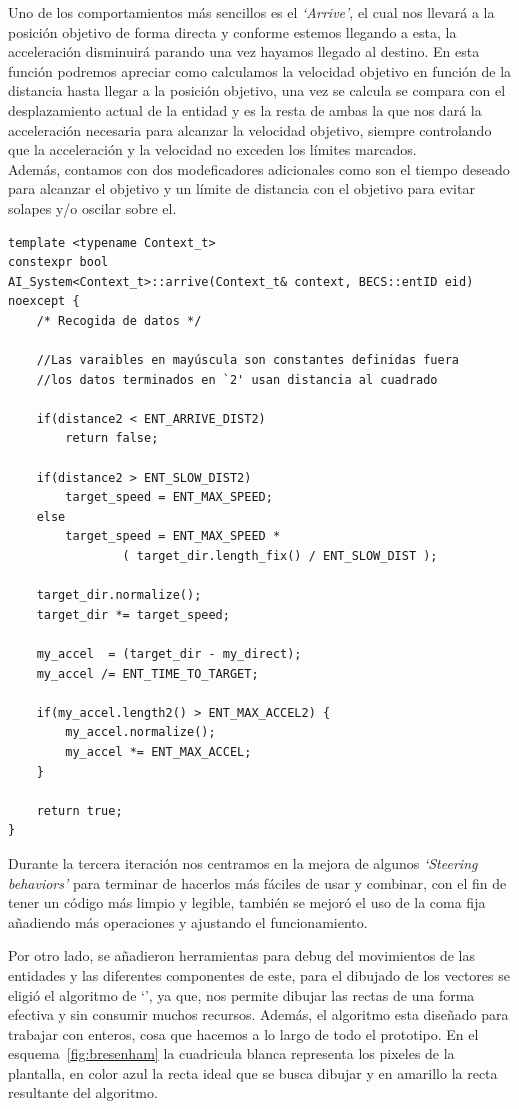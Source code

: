 Uno de los comportamientos más sencillos es el \textit{`Arrive'}, el cual nos
llevará a la posición objetivo de forma directa y conforme estemos llegando a esta, la 
acceleración disminuirá parando una vez hayamos llegado al destino. En esta función podremos
apreciar como calculamos la velocidad objetivo en función de la distancia hasta llegar a
la posición objetivo, una vez se calcula se compara con el desplazamiento actual de la entidad
y es la resta de ambas la que nos dará la acceleración necesaria para alcanzar la velocidad
objetivo, siempre controlando que la acceleración y la velocidad no exceden los límites 
marcados.\\
Además, contamos con dos modeficadores adicionales como son el tiempo deseado para alcanzar el
objetivo y un límite de distancia con el objetivo para evitar solapes y/o oscilar sobre el.

\begin{lstlisting}[style=CodigoC++, caption={Arrive behavior}, label=ia_arrive] 
template <typename Context_t>
constexpr bool
AI_System<Context_t>::arrive(Context_t& context, BECS::entID eid) noexcept {
	/* Recogida de datos */

	//Las varaibles en mayúscula son constantes definidas fuera
	//los datos terminados en `2' usan distancia al cuadrado

	if(distance2 < ENT_ARRIVE_DIST2)
		return false;

	if(distance2 > ENT_SLOW_DIST2)
		target_speed = ENT_MAX_SPEED;
	else
		target_speed = ENT_MAX_SPEED * 
				( target_dir.length_fix() / ENT_SLOW_DIST );
	
	target_dir.normalize();
	target_dir *= target_speed;

	my_accel  = (target_dir - my_direct);
	my_accel /= ENT_TIME_TO_TARGET;

	if(my_accel.length2() > ENT_MAX_ACCEL2) {
		my_accel.normalize();
		my_accel *= ENT_MAX_ACCEL;
	}

	return true;
}
\end{lstlisting}

Durante la tercera iteración nos centramos en la mejora de algunos \textit{`Steering behaviors'}
para terminar de hacerlos más fáciles de usar y combinar, con el fin de tener un código más 
limpio y legible, también se mejoró el uso de la coma fija añadiendo más operaciones y ajustando
el funcionamiento.

Por otro lado, se añadieron herramientas para debug del movimientos de las entidades y las
diferentes componentes de este, para el dibujado de los vectores se eligió el algoritmo de
`\citeauthor*{Bresenham1962}', ya que, nos permite dibujar las rectas de una forma efectiva
y sin consumir muchos recursos. Además, el algoritmo esta diseñado para trabajar con enteros,
cosa que hacemos a lo largo de todo el prototipo. En el esquema~\ref{fig:bresenham} la 
cuadricula blanca representa los pixeles de la plantalla, en color azul la recta ideal que
se busca dibujar y en amarillo la recta resultante del algoritmo.

